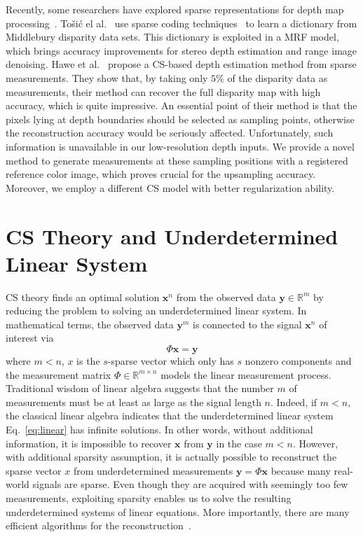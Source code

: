\documentclass[preprint,10pt,5p,times,twocolumn]{elsarticle}
\begin{document}
Recently, some researchers have explored sparse representations for depth map processing~\cite{TOC11,HKD11}. To\v{s}i\'{c} el al.~\cite{TOC11} use sparse coding techniques~\cite{OF97} to learn a dictionary from Middlebury disparity data sets. This dictionary is exploited in a MRF model, which brings accuracy improvements for stereo depth estimation and range image denoising. Hawe et al.~\cite{HKD11} propose a CS-based depth estimation method from sparse measurements. They show that, by taking only $5\%$ of the disparity data as measurements, their method can recover the full disparity map with high accuracy, which is quite impressive. An essential point of their method is that the pixels lying at depth boundaries should be selected as sampling points, otherwise the reconstruction accuracy would be seriously affected. Unfortunately, such information is unavailable in our low-resolution depth inputs. We provide a novel method to generate measurements at these sampling positions with a registered reference color image, which proves crucial for the upsampling accuracy. Moreover, we employ a different CS model with   better regularization ability.

\section{CS Theory and Underdetermined Linear System}
\label{sec:CS}

CS theory finds an optimal solution $\mathbf{x}^n$ from the observed data $\mathbf{y} \in \mathbb{R}^m$ by reducing the problem to solving an underdetermined linear system. In mathematical terms, the observed data $\mathbf{y}^m$ is connected to the signal $\mathbf{x}^n$ of interest via
%
\begin{equation}
\Phi \mathbf{x} = \mathbf{y}
\label{eq:linear}
\end{equation}
%
where $m < n$, $x$ is the $s$-sparse vector which only has $s$ nonzero components and the measurement matrix $\Phi \in \mathbb{R}^{m \times n}$ models the linear measurement process. Traditional wisdom of linear algebra suggests that the number $m$ of measurements must be at least as large as the signal length $n$. Indeed, if $m < n$, the classical linear algebra indicates that the underdetermined linear system Eq.~\eqref{eq:linear} has infinite solutions. In other words, without additional information, it is impossible to recover $\mathbf{x}$ from $\mathbf{y}$ in the case $m < n$. However, with additional sparsity assumption, it is actually possible to reconstruct the sparse vector $x$ from underdetermined measurements $\mathbf{y} = \Phi \mathbf{x} $ because many real-world signals are sparse. Even though they are acquired with seemingly too few measurements, exploiting sparsity enables us to solve the resulting underdetermined systems of linear equations. More importantly, there are many efficient algorithms for the reconstruction~\cite{Figueiredo_2007_TIP,Hale_2008_SIOPT,Wang_2010_SIIMS}.
\end{document}
